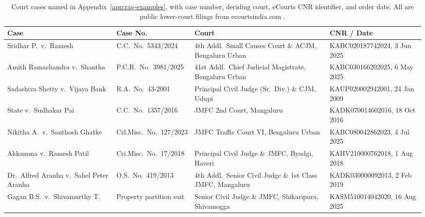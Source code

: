 \documentclass[11pt]{article}
\begin{document}
\begin{table}[H]
\centering
\small
\begin{tabular}{@{}p{3.7cm}p{2.6cm}p{5.3cm}p{2.4cm}@{}}
\toprule
\textbf{Case} & \textbf{Case No.} & \textbf{Court} & \textbf{CNR / Date} \\
\midrule
Sridhar P.\ v.\ Ramesh & C.C.\ No.\ 5343/2024 & 4th Addl.\ Small Causes Court \& ACJM, Bengaluru Urban & KABC020187742024, 3 Jun 2025 \\
Amith Ramachandra v.\ Shantha & P.C.R.\ No.\ 3981/2025 & 41st Addl.\ Chief Judicial Magistrate, Bengaluru Urban & KABC030166202025, 6 May 2025 \\
Sadashiva Shetty v.\ Vijaya Bank & R.A.\ No.\ 43-2001 & Principal Civil Judge (Sr.\ Div.) \& CJM, Udupi & KAUP020002942001, 24 Jan 2009 \\
State v.\ Sudhakar Pai & C.C.\ No.\ 1357/2016 & JMFC 2nd Court, Mangaluru & KADK070014602016, 18 Oct 2016 \\
Nikitha A.\ v.\ Santhosh Ghatke & Crl.Misc.\ No.\ 127/2023 & JMFC Traffic Court VI, Bengaluru Urban & KABC080042862023, 4 Jul 2025 \\
Akkamma v.\ Ramesh Patil & Cri.Misc.\ No.\ 17/2018 & Principal Civil Judge \& JMFC, Byadgi, Haveri & KAHV210000762018, 1 Aug 2018 \\
Dr.\ Alfred Aranha v.\ Sahel Peter Aranha & O.S.\ No.\ 419/2013 & 4th Addl.\ Senior Civil Judge \& 1st Class JMFC, Mangaluru & KADK030000092013, 2 Feb 2019 \\
Gagan B.S.\ v.\ Shivamurthy T. & Property partition suit & Senior Civil Judge \& JMFC, Shikaripura, Shivamogga & KASM510014042020, 16 Aug 2025 \\
\bottomrule
\end{tabular}
\caption{Court cases named in Appendix~\ref{app:rag-examples}, with case number, deciding court, eCourts CNR identifier, and order date. All are public lower-court filings from ecourtsindia.com .}
\label{tab:cases-cited}
\end{table}
\end{document}
